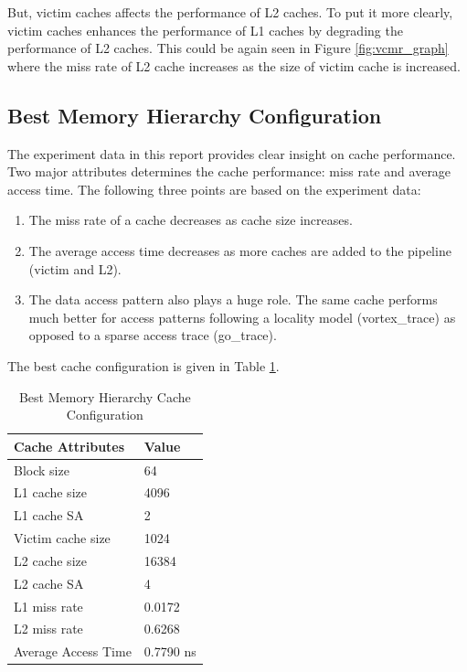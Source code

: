 \documentclass[a4paper]{article}
\begin{document}
But, victim caches affects the performance of L2 caches. To put it more clearly, victim caches enhances the performance of L1 caches by degrading the performance of L2 caches. This could be again seen in Figure \ref{fig:vcmr_graph} where the miss rate of L2 cache increases as the size of victim cache is increased.

\subsection{Best Memory Hierarchy Configuration}
The experiment data in this report provides clear insight on cache performance. Two major attributes determines the cache performance: miss rate and average access time. The following three points are based on the experiment data:
\begin{enumerate}
\item The miss rate of a cache decreases as cache size increases.
\item The average access time decreases as more caches are added to the pipeline (victim and L2).
\item The data access pattern also plays a huge role. The same cache performs much better for access patterns following a locality model (vortex\_trace) as opposed to a sparse access trace (go\_trace).
\end{enumerate}

The best cache configuration is given in Table \ref{tab:best_cache_config}.
\begin{table}[htbp]
    \centering
    \begin{center}
        \begin{tabular}{|l|l|}
            \hline
            \bf Cache Attributes & \bf Value \\ \hline
            Block size &  64 \\
            L1 cache size & 4096 \\
            L1 cache SA & 2 \\
            Victim cache size & 1024 \\
            L2 cache size & 16384  \\
            L2 cache SA & 4 \\ \hline
            L1 miss rate & 0.0172 \\
            L2 miss rate & 0.6268 \\
            Average Access Time & 0.7790 ns \\
            \hline
        \end{tabular}
        \captionsetup{justification=centering}
        \caption{Best Memory Hierarchy Cache Configuration}
        \label{tab:best_cache_config}
    \end{center}
\end{table}
\end{document}
